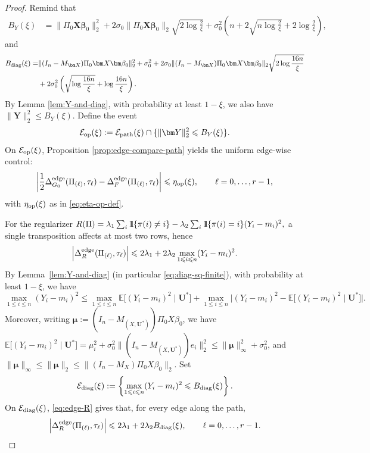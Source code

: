 \documentclass[11pt, reqno]{amsart}
\renewcommand{\le}{\leqslant}
\newcommand{\1}{\mbox{1}\hspace{-0.25em}\mbox{l}}
\theoremstyle{definition}\newtheorem{problem}{Problem}[section]
\theoremstyle{definition}\newtheorem{definition}[problem]{Definition}
\theoremstyle{remark}\newtheorem{assumption}{Assumption}
\theoremstyle{remark}\newtheorem{remark}[problem]{Remark}
\theoremstyle{definition}\newtheorem{example}[problem]{Example}
\theoremstyle{plain}\newtheorem{theorem}[problem]{Theorem}
\theoremstyle{plain}\newtheorem{question}[problem]{Question}
\theoremstyle{plain}\newtheorem{lemma}[problem]{Lemma}
\theoremstyle{plain}\newtheorem{proposition}[problem]{Proposition}
\theoremstyle{plain}\newtheorem{corollary}[problem]{Corollary}
\theoremstyle{plain}\newtheorem{conjecture}[problem]{Conjecture}
\begin{document}
\begin{proof}
Remind that 
\begin{align*}
B_Y(\xi) & = \|\Pi_0\bm X\bm\beta_0\|_2^2 + 2\sigma_0\|\Pi_0\bm X\bm\beta_0\|_2\sqrt{2\log\frac{2}{\xi}}
 + \sigma_0^2 \left(n+2\sqrt{n\log\frac{2}{\xi}}+2\log\frac{2}{\xi}\right),
\end{align*}
and
\begin{align*}
    B_{\rm diag}(\xi)
 = &\|(I_n-M_{\bm X})\Pi_0\bm X\bm\beta_0\|_2^2+\sigma_0^2
+2\sigma_0\|(I_n-M_{\bm X})\Pi_0\bm X\bm\beta_0\|_2\sqrt{2\log\frac{16n}{\xi}}
\\ 
&+2\sigma_0^2 \left(\sqrt{\log\frac{16n}{\xi}}+\log\frac{16n}{\xi}\right).
\end{align*}
By Lemma \ref{lem:Y-and-diag}, with probability at least $1-\xi$, we also have
$\|\bm Y\|_2^2\le B_Y(\xi)$.
Define the event
\[
\mathcal{E}_{\rm op}(\xi):=\mathcal E_{\rm path}(\xi)\cap\{\|\bm Y\|_2^2\le B_Y(\xi)\}.
\]
On $\mathcal{E}_{\rm op}(\xi)$, Proposition \ref{prop:edge-compare-path} yields the uniform edge-wise control:
\begin{equation}\label{eq:edge-eta}
\left|
\frac{1}{2}\Delta_{G_0}^{\rm edge}(\Pi_{(\ell)},\tau_\ell)-\Delta_F^{\rm edge}(\Pi_{(\ell)},\tau_\ell)
\right|
\le\eta_{\rm op}(\xi),
\qquad \ell=0,\ldots,r-1,
\end{equation}
with $\eta_{\rm op}(\xi)$ as in \eqref{eq:eta-op-def}.

For the regularizer
$
R(\Pi)=\lambda_1\sum_{i}\1\{\pi(i)\neq i\}-\lambda_2\sum_{i}\1\{\pi(i)=i\}(Y_i-m_i)^2,
$
a single transposition affects at most two rows, hence
\begin{equation}\label{eq:edge-R}
\left|\Delta_R^{\rm edge}(\Pi_{(\ell)},\tau_\ell)\right| \le 2\lambda_1 + 2\lambda_2 \max_{1\le i\le n}(Y_i-m_i)^2.
\end{equation}
By Lemma~\ref{lem:Y-and-diag} (in particular \eqref{eq:diag-sq-finite}), with probability at least $1-\xi$, we have
\[
\max_{1\le i\le n} (Y_i-m_i)^2
\le \max_{1\le i\le n}\mathbb{E}\big[(Y_i-m_i)^2\mid \bm U^*\big]
     + \max_{1\le i\le n}\Big|(Y_i-m_i)^2-\mathbb{E}\big[(Y_i-m_i)^2\mid \bm U^*\big]\Big|.
\]
Moreover, writing $\bm\mu:=(I_n-M_{(X,\bm U^*)})\Pi_0X\beta_0$, we have
$\mathbb{E}\big[(Y_i-m_i)^2\mid \bm U^*\big]=\mu_i^2+\sigma_0^2\|(I_n-M_{(X,\bm U^*)})e_i\|_2^2\le \|\bm\mu\|_\infty^2+\sigma_0^2$,
and $\|\bm\mu\|_\infty\le \|\bm\mu\|_2\le \|(I_n-M_X)\Pi_0X\beta_0\|_2$.
Set
\[
\mathcal{E}_{\rm diag}(\xi):=\left\{\max_{1\le i\le n}(Y_i-m_i)^2\le B_{\rm diag}(\xi)\right\}.
\]
On $\mathcal{E}_{\rm diag}(\xi)$, \eqref{eq:edge-R} gives that, for every edge along the path,
\begin{equation}\label{eq:edge-R-ub}
\left|\Delta_R^{\rm edge}(\Pi_{(\ell)},\tau_\ell)\right| \le 2\lambda_1+2\lambda_2 B_{\rm diag}(\xi),
\qquad \ell=0,\ldots,r-1.
\end{equation}


\end{proof}
\end{document}

